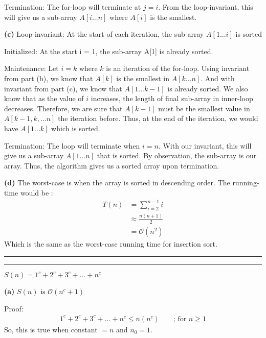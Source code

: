 \documentclass[a4paper, 12pt]{article}
\newcommand{\question}[1] {\vspace{.25in} \hrule\vspace{0.5em}
\noindent{\bf #1} \vspace{0.5em}
\hrule \vspace{.10in}}
\renewcommand{\part}[1] {\vspace{10pt} {\bf (#1)}}
\begin{document}
Termination: The for-loop will terminate at $j = i$. From the loop-invariant, this will give us a sub-array $A[i...n]$ where $A[i]$ is the smallest.

\part{c} Loop-invariant: At the start of each iteration, the sub-array $A[1...i]$ is sorted

Initialized: At the start i = 1, the sub-array A[1] is already sorted.

Maintenance: Let $i = k$ where $k$ is an iteration of the for-loop. Using invariant from part (b), we know that $A[k]$ is the smallest in $A[k...n]$. And with invariant from part (c), we know that $A[1...k-1]$ is already sorted. We also know that as the value of $i$ increases, the length of final sub-array in inner-loop decreases. Therefore, we are sure that $A[k-1]$ must be the smallest value in $A[k-1,k,...n]$ the iteration before. Thus, at the end of the iteration, we would have $A[1...k]$ which is sorted.

Termination: The loop will terminate when $i = n$. With our invariant, this will give us a sub-array $A[1...n]$ that is sorted. By observation, the sub-array is our array. Thus, the algorithm gives us a sorted array upon termination.

\part{d} The worst-case is when the array is sorted in descending order. The running-time would be :
\begin{align*}
	T(n) &= \sum_{i=2}^{n-1} i\\
	&\approx \frac{n(n+1)}{2}\\
	&= \mathcal{O}(n^2)
\end{align*}
Which is the same as the worst-case running time for insertion sort.
\question{Problem 3}
$S(n) = 1^c + 2^c +3^c +...+n^c$

\part{a} $S(n) \text{ is } \mathcal{O}(n^c+1)$

Proof:
\begin{align*}
	1^c + 2^c +3^c +...+n^c \leqslant n(n^c) && \text{ ; for } n\geqslant 1
\end{align*}
So, this is true when constant $= n$ and $n_0 = 1$.
\end{document}
